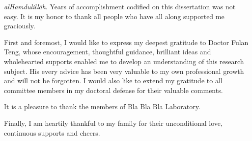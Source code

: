 \textit{alHamdulillāh}. Years of accomplishment codified on this dissertation was not easy.
It is my honor to thank all people who have all along supported me graciously.

First and foremost, I would like to express my deepest gratitude to Doctor Fulan Teng,
whose encouragement, thoughtful guidance, brilliant ideas and wholehearted supports
enabled me to develop an understanding of this research subject.
His every advice has been very valuable to my own professional growth and will not be forgotten.
I would also like to extend my gratitude to 
all committee members in my doctoral defense for their valuable comments.

It is a pleasure to thank the members of Bla Bla Bla Laboratory.

Finally, I am heartily thankful to my family
for their unconditional love, continuous supports and cheers.